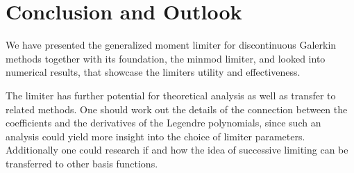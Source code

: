 \section{Conclusion and Outlook}
\label{sec:conclusion}

We have presented the generalized moment limiter for discontinuous Galerkin methods together with its foundation, the minmod limiter, and looked into numerical results, that showcase the limiters utility and effectiveness.

The limiter has further potential for theoretical analysis as well as transfer to related methods.
One should work out the details of the connection between the coefficients and the derivatives of the Legendre polynomials, since such an analysis could yield more insight into the choice of limiter parameters.
Additionally one could research if and how the idea of successive limiting can be transferred to other basis functions.
